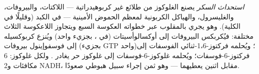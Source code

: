 \begin{definition}\label{def:b1:biosyntheses-integration:gluconeogenesis}
\emph{استحداث السكر} يصنع الغلوكوز من طلائع غير كربوهيدراتية ---
اللاكتات، والبيروفات، والغليسرول، والهياكل الكربونية لمعظم الحموض
الأمينية --- في الكبد (وقليلًا في الكلية). وهو يجري 
بالمقلوب عبر خطواته العكوسة السبع ويتجاوز اللاعكوسة الثلاث 
مختلفة: فيُكربكس البيروفات إلى أوكسالوأسيتات (في ، بجزيء 
واحد) ويُنزع كربوكسيله إلى فوسفوإينول بيروفات (بجزيء GTP واحد)؛
ويُحلمه فركتوز-1،6-ثنائي الفوسفات إلى فركتوز-6-فوسفات؛ ويُحلمه
غلوكوز-6-فوسفات إلى غلوكوز حر يغادر . ولكل غلوكوز: 6 مكافئات
 و2 NADH، مقابل  اثنين يعطيهما  --- وهو ثمن إجراء
سبيل هبوطي صعودًا.
\end{definition}

